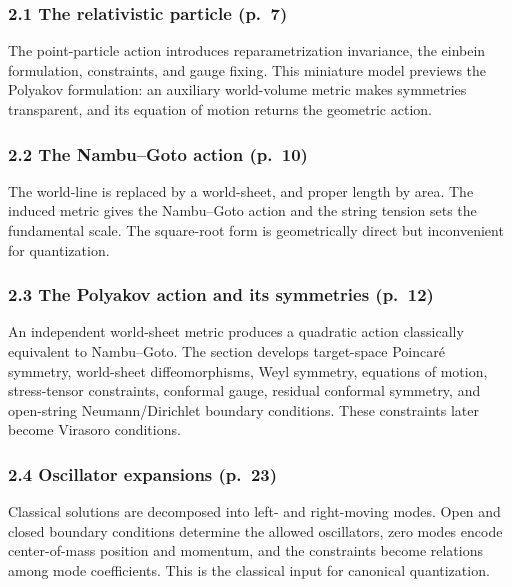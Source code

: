 \documentclass[
  10pt,
  a4paper,
  openany]{book}
\begin{document}
\subsubsection{2.1 The relativistic particle
(p.~7)}\label{the-relativistic-particle-p.-7}

The point-particle action introduces reparametrization invariance, the
einbein formulation, constraints, and gauge fixing. This miniature model
previews the Polyakov formulation: an auxiliary world-volume metric
makes symmetries transparent, and its equation of motion returns the
geometric action.

\subsubsection{2.2 The Nambu--Goto action
(p.~10)}\label{the-nambugoto-action-p.-10}

The world-line is replaced by a world-sheet, and proper length by area.
The induced metric gives the Nambu--Goto action and the string tension
sets the fundamental scale. The square-root form is geometrically direct
but inconvenient for quantization.

\subsubsection{2.3 The Polyakov action and its symmetries
(p.~12)}\label{the-polyakov-action-and-its-symmetries-p.-12}

An independent world-sheet metric produces a quadratic action
classically equivalent to Nambu--Goto. The section develops target-space
Poincaré symmetry, world-sheet diffeomorphisms, Weyl symmetry, equations
of motion, stress-tensor constraints, conformal gauge, residual
conformal symmetry, and open-string Neumann/Dirichlet boundary
conditions. These constraints later become Virasoro conditions.

\subsubsection{2.4 Oscillator expansions
(p.~23)}\label{oscillator-expansions-p.-23}

Classical solutions are decomposed into left- and right-moving modes.
Open and closed boundary conditions determine the allowed oscillators,
zero modes encode center-of-mass position and momentum, and the
constraints become relations among mode coefficients. This is the
classical input for canonical quantization.
\end{document}
